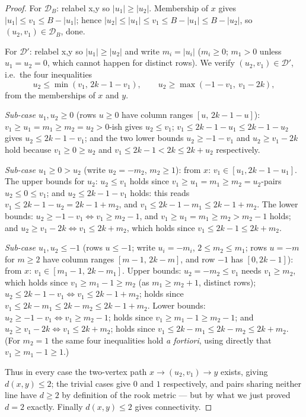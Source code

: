 \documentclass[12pt]{article}
\theoremstyle{definition}
\newcommand{\DD}{\mathcal{D}}
\newcommand{\DDs}{\mathcal{D}'}
\begin{document}
\begin{proof}
For $\DD_B$: relabel x,y so $|u_1|\ge|u_2|$. Membership of $x$ gives $|u_1|\le v_1\le B-|u_1|$; hence $|u_2|\le|u_1|\le v_1\le B-|u_1|\le B-|u_2|$, so $(u_2,v_1)\in\DD_B$, done.

For $\DDs$: relabel x,y so $|u_1|\ge|u_2|$ and write $m_i=|u_i|$ ($m_i\ge0$; $m_1>0$ unless $u_1=u_2=0$, which cannot happen for distinct rows). We verify $(u_2,v_1)\in\DDs$, i.e.\ the four inequalities
\[
u_2\le \min(v_1,\,2k-1-v_1),\qquad u_2\ge \max(-1-v_1,\ v_1-2k),
\]
from the memberships of $x$ and $y$.

\emph{Sub-case $u_1,u_2\ge0$} (rows $u\ge0$ have column ranges $[u,\,2k-1-u]$): $v_1\ge u_1=m_1\ge m_2=u_2>0$-ish gives $u_2\le v_1$; $v_1\le 2k-1-u_1\le 2k-1-u_2$ gives $u_2\le 2k-1-v_1$; and the two lower bounds $u_2\ge -1-v_1$ and $u_2\ge v_1-2k$ hold because $v_1\ge 0\ge u_2$ and $v_1\le 2k-1<2k\le 2k+u_2$ respectively.

\emph{Sub-case $u_1\ge0>u_2$} (write $u_2=-m_2$, $m_2\ge1$): from $x$: $v_1\in[u_1, 2k-1-u_1]$. The upper bounds for $u_2$: $u_2\le v_1$ holds since $v_1\ge u_1=m_1\ge m_2=u_2$-pairs $u_2\le 0\le v_1$; and $u_2\le 2k-1-v_1$ holds: this reads $v_1\le 2k-1-u_2=2k-1+m_2$, and $v_1\le 2k-1-m_1\le 2k-1+m_2$. The lower bounds: $u_2\ge -1-v_1 \iff v_1\ge m_2-1$, and $v_1\ge u_1=m_1\ge m_2>m_2-1$ holds; and $u_2\ge v_1-2k\iff v_1\le 2k+m_2$, which holds since $v_1\le 2k-1\le 2k+m_2$.

\emph{Sub-case $u_1,u_2\le-1$} (rows $u\le-1$; write $u_i=-m_i$, $2\le m_2\le m_1$; rows $u=-m$ for $m\ge2$ have column ranges $[m-1,\,2k-m]$, and row $-1$ has $[0,2k-1]$): from $x$: $v_1\in[m_1-1,\,2k-m_1]$. Upper bounds: $u_2=-m_2\le v_1$ needs $v_1\ge m_2$, which holds since $v_1\ge m_1-1\ge m_2$ (as $m_1\ge m_2+1$, distinct rows); $u_2\le 2k-1-v_1\iff v_1\le 2k-1+m_2$; holds since $v_1\le 2k-m_1\le 2k-m_2\le2k-1+m_2$. Lower bounds: $u_2\ge -1-v_1\iff v_1\ge m_2-1$; holds since $v_1\ge m_1-1\ge m_2-1$; and $u_2\ge v_1-2k\iff v_1\le 2k+m_2$; holds since $v_1\le 2k-m_1\le 2k-m_2\le 2k+m_2$. (For $m_2=1$ the same four inequalities hold \emph{a fortiori}, using directly that $v_1\ge m_1-1\ge1$.)

Thus in every case the two-vertex path $x\to(u_2,v_1)\to y$ exists, giving $d(x,y)\le2$; the trivial cases give $0$ and $1$ respectively, and pairs sharing neither line have $d\ge2$ by definition of the rook metric --- but by what we just proved $d=2$ exactly. Finally $d(x,y)\le2$ gives connectivity.
\end{proof}
\end{document}
